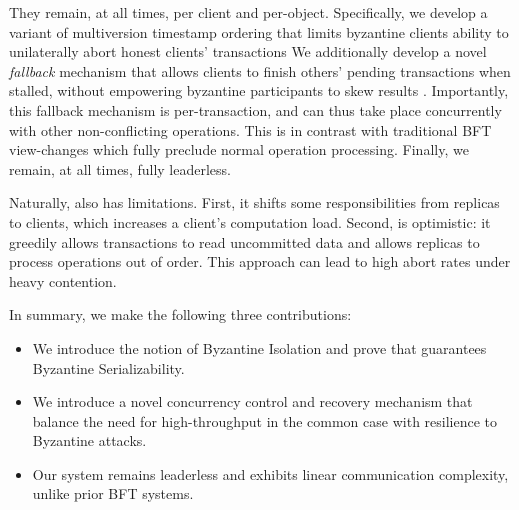 They remain, at all times, per client and per-object. 
\fi
Specifically, we develop a variant of multiversion timestamp ordering that limits byzantine clients ability to unilaterally abort honest clients' transactions%
 We additionally develop a novel \textit{fallback} mechanism that allows clients to finish others' pending transactions when stalled, without empowering byzantine participants to skew results . Importantly, this fallback mechanism is per-transaction, and can thus take place concurrently with other non-conflicting operations. This is in contrast with traditional BFT view-changes which fully preclude normal operation processing. Finally, we remain, at all times, fully leaderless. 

Naturally, \sys{} also has limitations. First, it shifts some
responsibilities from replicas to clients, which increases a client's computation load. Second, \sys{} is optimistic: it greedily allows transactions to read uncommitted data and allows replicas to process operations out of order. This approach can lead to high abort rates under heavy contention.

In summary, we make the following three contributions: 
\begin{itemize}
\item We introduce the notion of Byzantine Isolation and prove that \sys guarantees
Byzantine Serializability.
\item We introduce a novel concurrency control and recovery  mechanism that balance the need for high-throughput in
the common case with resilience to Byzantine attacks.
\item Our system remains leaderless and exhibits linear communication complexity, unlike prior BFT systems. 
\end{itemize}


